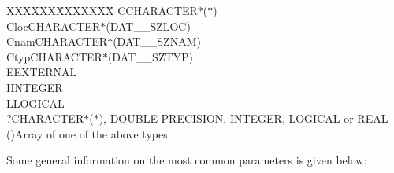 \begin{tabbing}
XXXXXX\=XXXXXXX\=\kill
\>\+C\>CHARACTER$*$($*$)\\
Cloc\>CHARACTER$*$(DAT\_\_SZLOC)\\
Cnam\>CHARACTER$*$(DAT\_\_SZNAM)\\
Ctyp\>CHARACTER$*$(DAT\_\_SZTYP)\\
E\>EXTERNAL\\
I\>INTEGER\\
L\>LOGICAL\\
?\>CHARACTER$*$($*$), DOUBLE PRECISION, INTEGER, LOGICAL or REAL\\
()\>Array of one of the above types
\end{tabbing}

Some general information on the most common parameters is given below:

